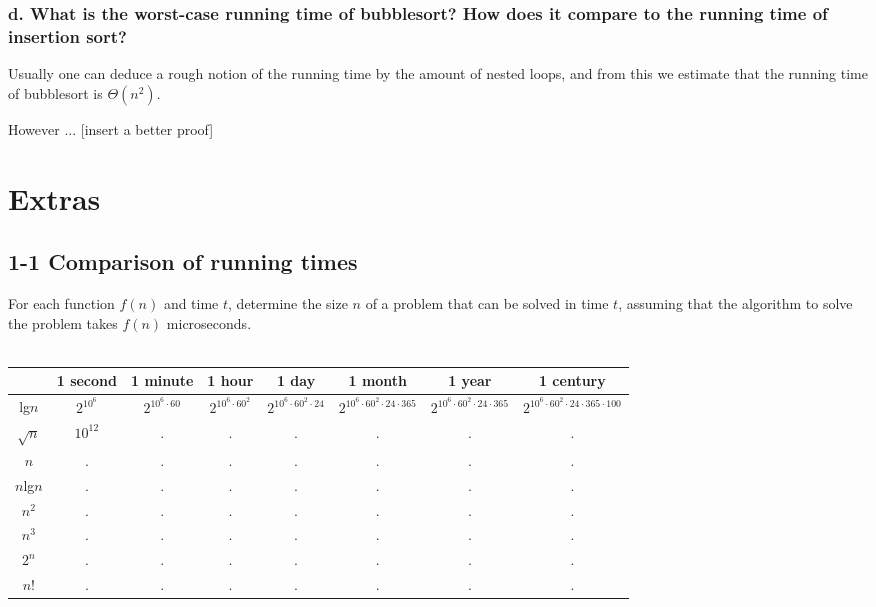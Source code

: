 \documentclass[11pt,english]{article}
\begin{document}
\subsubsection*{d. \mdseries What is the worst-case running time of
bubblesort? How does it compare to the running time of insertion sort?}
Usually one can deduce a rough notion of the running time by the amount of
nested loops, and from this we estimate that the running time of bubblesort
is $\Theta(n^2)$.

However ... [insert a better proof]






\newpage
\section*{Extras}

\subsection*{1-1 Comparison of running times}
For each function $f(n)$ and time $t$, determine the size $n$ of a problem
that can be solved in time $t$, assuming that the algorithm to solve the
problem takes $f(n)$ microseconds.
\\\\
\small
\begin{tabular}[]{|c|c|c|c|c|c|c|c|}
	\hline
	{\ } & 1 second & 1 minute & 1 hour & 1 day & 1 month & 1 year & 1 century\\
	\hline
	
	lg$n$ & $2^{10^6}$ & $2^{10^6 \cdot 60}$ & $2^{10^6 \cdot 60^2}$ &
	$2^{10^6 \cdot 60^2 \cdot 24}$ & $2^{10^6 \cdot 60^2 \cdot 24 \cdot 365}$ &
	$2^{10^6 \cdot 60^2 \cdot 24 \cdot 365}$ &
	$2^{10^6 \cdot 60^2 \cdot 24 \cdot 365 \cdot 100}$\\	
	
	$\sqrt{n}$ & $10^{12}$ & . & . & . & . & . & .\\
	
	$n$ & . & . & . & . & . & . & .\\ 
	
	$n$lg$n$ & . & . & . & . & . & . & .\\ 
	
	$n^2$ & . & . & . & . & . & . & .\\ 
	
	$n^3$ & . & . & . & . & . & . & .\\ 
	
	$2^n$ & . & . & . & . & . & . & .\\ 
	
	$n$! & . & . & . & . & . & . & .\\ 
	
	\hline
\end{tabular}
\end{document}
